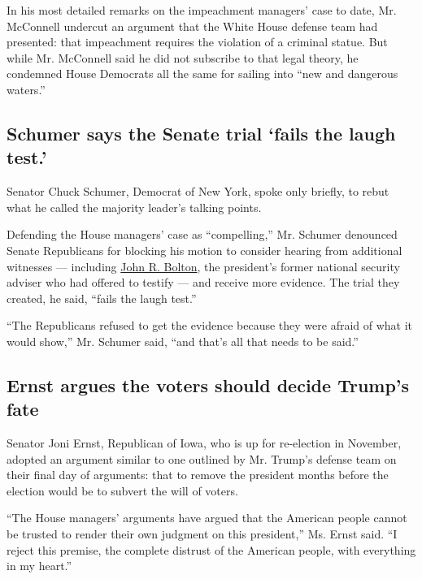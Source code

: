 In his most detailed remarks on the impeachment managers' case to date,
Mr. McConnell undercut an argument that the White House defense team had
presented: that impeachment requires the violation of a criminal statue.
But while Mr. McConnell said he did not subscribe to that legal theory,
he condemned House Democrats all the same for sailing into ``new and
dangerous waters.''

\hypertarget{schumer-says-the-senate-trial-fails-the-laugh-test}{%
\subsection{Schumer says the Senate trial `fails the laugh
test.'}\label{schumer-says-the-senate-trial-fails-the-laugh-test}}

Senator Chuck Schumer, Democrat of New York, spoke only briefly, to
rebut what he called the majority leader's talking points.

Defending the House managers' case as ``compelling,'' Mr. Schumer
denounced Senate Republicans for blocking his motion to consider hearing
from additional witnesses --- including
\href{https://www.nytimes3xbfgragh.onion/2020/01/31/us/politics/trump-bolton-ukraine.html}{John
R. Bolton}, the president's former national security adviser who had
offered to testify --- and receive more evidence. The trial they
created, he said, ``fails the laugh test.''

``The Republicans refused to get the evidence because they were afraid
of what it would show,'' Mr. Schumer said, ``and that's all that needs
to be said.''

\hypertarget{ernst-argues-the-voters-should-decide-trumps-fate}{%
\subsection{Ernst argues the voters should decide Trump's
fate}\label{ernst-argues-the-voters-should-decide-trumps-fate}}

Senator Joni Ernst, Republican of Iowa, who is up for re-election in
November, adopted an argument similar to one outlined by Mr. Trump's
defense team on their final day of arguments: that to remove the
president months before the election would be to subvert the will of
voters.

``The House managers' arguments have argued that the American people
cannot be trusted to render their own judgment on this president,'' Ms.
Ernst said. ``I reject this premise, the complete distrust of the
American people, with everything in my heart.''

